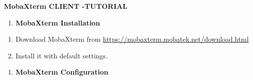 \textbf{MobaXterm CLIENT -TUTORIAL}

\begin{enumerate}
	\def\labelenumi{\Alph{enumi}.}
	\setcounter{enumi}{6}
	\item
	\textbf{MobaXterm Installation}
\end{enumerate}

\begin{enumerate}
	\def\labelenumi{\arabic{enumi}.}
	\item
	Download MobaXterm from
	\url{https://mobaxterm.mobatek.net/download.html}
	\item
	Install it with default settings.
\end{enumerate}

\begin{enumerate}
	\def\labelenumi{\Alph{enumi}.}
	\setcounter{enumi}{7}
	\item
	\textbf{MobaXterm Configuration}
\end{enumerate}

